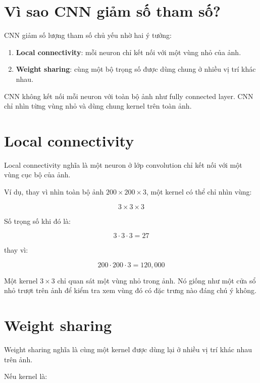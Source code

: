 \documentclass[12pt,a4paper]{report}
\begin{document}
\section{Vì sao CNN giảm số tham số?}

CNN giảm số lượng tham số chủ yếu nhờ hai ý tưởng:

\begin{enumerate}
    \item \textbf{Local connectivity}: mỗi neuron chỉ kết nối với một vùng nhỏ của ảnh.
    \item \textbf{Weight sharing}: cùng một bộ trọng số được dùng chung ở nhiều vị trí khác nhau.
\end{enumerate}

\begin{ghinho}
CNN không kết nối mỗi neuron với toàn bộ ảnh như fully connected layer. CNN chỉ nhìn từng vùng nhỏ và dùng chung kernel trên toàn ảnh.
\end{ghinho}

\section{Local connectivity}

Local connectivity nghĩa là một neuron ở lớp convolution chỉ kết nối với một vùng cục bộ của ảnh.

Ví dụ, thay vì nhìn toàn bộ ảnh $200 \times 200 \times 3$, một kernel có thể chỉ nhìn vùng:

\[
    3 \times 3 \times 3
\]

Số trọng số khi đó là:

\[
    3 \cdot 3 \cdot 3 = 27
\]

thay vì:

\[
    200 \cdot 200 \cdot 3 = 120,000
\]

\begin{vidu}
Một kernel $3 \times 3$ chỉ quan sát một vùng nhỏ trong ảnh. Nó giống như một cửa sổ nhỏ trượt trên ảnh để kiểm tra xem vùng đó có đặc trưng nào đáng chú ý không.
\end{vidu}

\section{Weight sharing}

Weight sharing nghĩa là cùng một kernel được dùng lại ở nhiều vị trí khác nhau trên ảnh.

Nếu kernel là:
\end{document}
